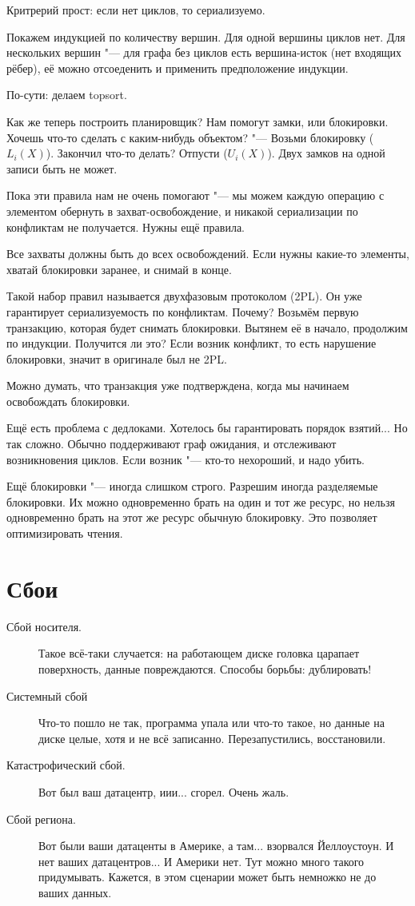 
Критрерий прост: если нет циклов, то сериализуемо.

Покажем индукцией по количеству вершин. Для одной вершины циклов нет.
Для нескольких вершин "--- для графа без циклов есть вершина-исток (нет входящих рёбер), её можно отсоеденить и применить предположение индукции.

По-сути: делаем topsort.

Как же теперь построить планировщик?
Нам помогут замки, или блокировки.
Хочешь что-то сделать с каким-нибудь объектом? "--- Возьми блокировку ($L_i(X)$).
Закончил что-то делать? Отпусти ($U_i(X)$).
Двух замков на одной записи быть не может.

Пока эти правила нам не очень помогают "--- мы можем каждую операцию с элементом обернуть в захват-освобождение, и никакой сериализации по конфликтам не получается. Нужны ещё правила.

Все захваты должны быть до всех освобождений.
Если нужны какие-то элементы, хватай блокировки заранее, и снимай в конце.

Такой набор правил называется двухфазовым протоколом (2PL).
Он уже гарантирует сериализуемость по конфликтам.
Почему? Возьмём первую транзакцию, которая будет снимать блокировки.
Вытянем её в начало, продолжим по индукции.
Получится ли это? Если возник конфликт, то есть нарушение блокировки, значит в оригинале был не 2PL.

Можно думать, что транзакция уже подтверждена, когда мы начинаем освобождать блокировки.

Ещё есть проблема с дедлоками. Хотелось бы гарантировать порядок взятий... Но так сложно.
Обычно поддерживают граф ожидания, и отслеживают возникновения циклов. Если возник "--- кто-то нехороший, и надо убить.

Ещё блокировки "--- иногда слишком строго.
Разрешим иногда разделяемые блокировки.
Их можно одновременно брать на один и тот же ресурс, но нельзя одновременно брать на этот же ресурс обычную блокировку.
Это позволяет оптимизировать чтения.

\section{Сбои}

\begin{description}
\item[Сбой носителя.]
	Такое всё-таки случается: на работающем диске головка царапает поверхность, данные повреждаются.
	Способы борьбы: дублировать!

\item[Системный сбой]
	Что-то пошло не так, программа упала или что-то такое, но данные на диске целые, хотя и не всё записанно.
	Перезапустились, восстановили.

\item[Катастрофический сбой.]
	Вот был ваш датацентр, иии... сгорел. Очень жаль.

\item[Сбой региона.]
	Вот были ваши датаценты в Америке, а там... взорвался Йеллоустоун.
	И нет ваших датацентров... И Америки нет.
	Тут можно много такого придумывать.
	Кажется, в этом сценарии может быть немножко не до ваших данных.
\end{description}


